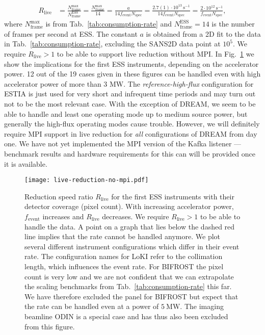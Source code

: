 \documentclass[a4paper,english,numbers=noenddot,bibliography=totoc,chapterprefix=on,DIV=12]{scrartcl}
\newcommand{\Nspec}{N_{\text{spec}}}
\newcommand{\Fevent}{f_{\text{event}}}
\newcommand{\bifrost}{BIFROST\xspace}
\newcommand{\dream}{DREAM\xspace}
\newcommand{\estia}{ESTIA\xspace}
\newcommand{\loki}{LoKI\xspace}
\newcommand{\odin}{ODIN\xspace}
\begin{document}
\begin{align}
  R_{\text{live}} &= \frac{N_{\text{frame}}^{\text{max}}}{N_{\text{frame}}^{\text{ESS}}} = \frac{N_{\text{frame}}^{\text{max}}}{14} = \frac{a}{14\Fevent\Nspec} = \frac{2.7(1)\cdot10^{13}~\mathrm{s}^{-1}}{14\Fevent\Nspec} = \frac{2\cdot10^{12}~\mathrm{s}^{-1}}{\Fevent\Nspec},
\end{align}
where $N_{\text{frame}}^{\text{max}}$ is from Tab.~\ref{tab:consumption-rate} and $N_{\text{frame}}^{\text{ESS}} = 14$ is the number of frames per second at ESS.
The constant $a$ is obtained from a 2D fit to the data in Tab.~\ref{tab:consumption-rate}, excluding the SANS2D data point at $10^5$.
We require $R_{\text{live}} > 1$ to be able to support live reduction without MPI.
In Fig.~\ref{fig:live-reduction-no-mpi} we show the implications for the first ESS instruments, depending on the accelerator power.
12 out of the 19 cases given in these figures can be handled even with high accelerator power of more than 3 MW.
The \emph{reference-high-flux} configuration for \estia is just used for very short and infrequent time periods and may turn out not to be the most relevant case.
With the exception of \dream, we seem to be able to handle and least one operating mode up to medium source power, but generally the high-flux operating modes cause trouble.
However, we will definitely require MPI support in live reduction for \emph{all} configurations of \dream from day one.
We have not yet implemented the MPI version of the Kafka listener --- benchmark results and hardware requirements for this can will be provided once it is available.

\begin{figure}
  \centering
\texttt{[image: live-reduction-no-mpi.pdf]}
\caption{\label{fig:live-reduction-no-mpi}Reduction speed ratio $R_{\text{live}}$ for the first ESS instruments with their detector coverage (pixel count).
With increasing accelerator power, $\Fevent$ increases and $R_{\text{live}}$ decreases.
We require $R_{\text{live}} > 1$ to be able to handle the data.
A point on a graph that lies below the dashed red line implies that the rate cannot be handled anymore.
We plot several different instrument configurations which differ in their event rate.
The configuration names for \loki refer to the collimation length, which influences the event rate.
For \bifrost the pixel count is very low and we are not confident that we can extrapolate the scaling benchmarks from Tab.~\ref{tab:consumption-rate} this far.
We have therefore excluded the panel for \bifrost but expect that the rate can be handled even at a power of $5~\mathrm{MW}$.
The imaging beamline \odin is a special case and has thus also been excluded from this figure.
}
\end{figure}
\end{document}

